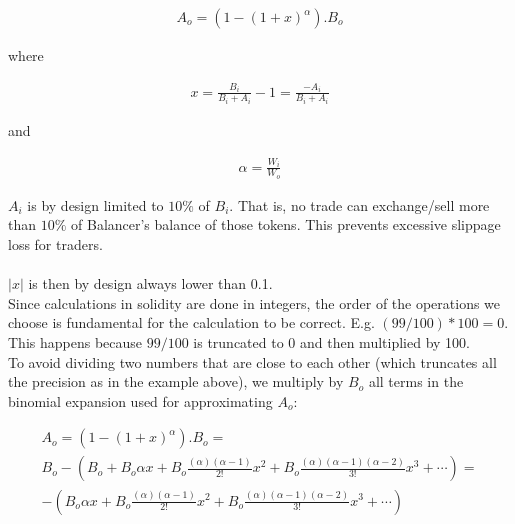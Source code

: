 \documentclass[11pt]{amsart}
\begin{document}
\begin{equation}
\begin{gathered}
A_o = \left(1 - \left(1+x\right)^{\alpha}\right).B_o
\end{gathered}
\end{equation}

where

\begin{equation}
\begin{gathered}
x = \frac{B_i}{B_i+A_i} - 1 = \frac{-A_i}{B_i+A_i}
\end{gathered}
\end{equation}

and

\begin{equation}
\begin{gathered}
\alpha = \frac{W_i}{W_o}
\end{gathered}
\end{equation}

$A_i$ is by design limited to $10\%$ of $B_i$. That is, no trade can exchange/sell more than $10\%$ of Balancer's balance of those tokens. This prevents excessive slippage loss for traders.
\\
\\
$|x|$ is then by design always lower than 0.1.
\\

Since calculations in solidity are done in integers, the order of the operations we choose is fundamental for the calculation to be correct. E.g. $(99/100)*100 = 0$. This happens because $99/100$ is truncated to 0 and then multiplied by 100.
\\

To avoid dividing two numbers that are close to each other (which truncates all the precision as in the example above), we multiply by $B_o$ all terms in the binomial expansion used for approximating $A_o$:


\begin{equation}
\begin{gathered}
A_o=
\left(1 - \left(1+x\right)^{\alpha}\right).B_o =
\\
B_o - \left(B_o + B_o\alpha x+
B_o\frac{(\alpha)(\alpha-1)}{2!}x^2+
B_o\frac{(\alpha)(\alpha-1)(\alpha-2)}{3!}x^3+
\cdots\right) =
\\
-\left(B_o\alpha x+
B_o\frac{(\alpha)(\alpha-1)}{2!}x^2+
B_o\frac{(\alpha)(\alpha-1)(\alpha-2)}{3!}x^3+
\cdots \right)
\end{gathered}
\end{equation}
\end{document}
